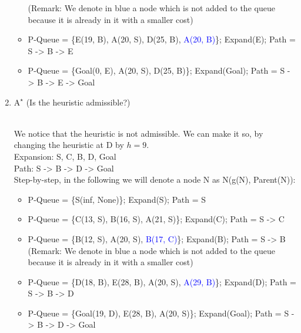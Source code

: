 \documentclass[9pt,a4paper]{extarticle}
\newenvironment{solution}
    {%
    \color{red}
    }
    { 
    \color{black}
    }
\newcommand{\blue}[1]{\textcolor{blue}{#1}}
\begin{document}
\begin{enumerate}
\begin{solution}
\begin{itemize}
            (Remark: We denote in blue a node which is not added to the queue because it is already in it with a smaller cost)
            \item P-Queue = \{E(19, B), A(20, S), D(25, B), \blue{A(20, B)}\}; Expand(E); Path = S -> B -> E
            \item P-Queue = \{Goal(0, E), A(20, S), D(25, B)\}; Expand(Goal); Path = S -> B -> E -> Goal
        \end{itemize}
        \end{solution}
        \item $\text{A}^\star$ (Is the heuristic admissible?)
        \begin{solution}
        \\
        We notice that the heuristic is not admissible. We can make it so, by changing the heuristic at D by $h=9$.
        \\
        Expansion: S, C, B, D, Goal\\
        Path: S -> B -> D -> Goal\\
        Step-by-step, in the following we will denote a node N as N(g(N), Parent(N)):
        \begin{itemize}
            \item P-Queue = \{S(inf, None)\}; Expand(S); Path = S
            \item P-Queue = \{C(13, S), B(16, S), A(21, S)\}; Expand(C); Path = S -> C
            \item P-Queue = \{B(12, S), A(20, S), \blue{B(17, C)}\}; Expand(B); Path = S -> B
            (Remark: We denote in blue a node which is not added to the queue because it is already in it with a smaller cost)
            \item P-Queue = \{D(18, B), E(28, B), A(20, S), \blue{A(29, B)}\}; Expand(D); Path = S -> B -> D
            \item P-Queue = \{Goal(19, D), E(28, B), A(20, S)\}; Expand(Goal); Path = S -> B -> D -> Goal
        \end{itemize}
        \end{solution}
    \end{enumerate}
\end{document}

